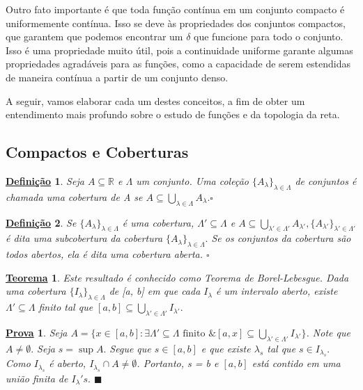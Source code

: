 \documentclass{article}
\newtheorem*{def*}{\underline{Defini\c c\~ao}}
\newtheorem*{theorem*}{\underline{Teorema}}
\newtheorem*{proof*}{\underline{Prova}}
\renewcommand\qedsymbol{$\blacksquare$}
\begin{document}
Outro fato importante é que toda função contínua em um conjunto compacto é uniformemente contínua. Isso se deve às propriedades
dos conjuntos compactos, que garantem que podemos encontrar um $\delta$ que funcione para todo o conjunto. Isso é uma
propriedade muito útil, pois a continuidade uniforme garante algumas propriedades agradáveis para as funções, como a
capacidade de serem estendidas de maneira contínua a partir de um conjunto denso.

A seguir, vamos elaborar cada um destes conceitos, a fim de obter um entendimento mais profundo sobre o estudo de funções e da 
topologia da reta.

\subsection{Compactos e Coberturas}
 \begin{def*}
   Seja $A\subseteq{\mathbb{R}}$ e $\Lambda $ um conjunto. Uma coleção $\{A_{\lambda }\}_{\lambda \in\Lambda }$ de conjuntos
   é chamada uma cobertura de A se $A\subseteq{\bigcup_{\lambda \in\Lambda }^{}{A_{\lambda }}}.\square$
 \end{def*}
\begin{def*}
  Se $\{A_{\lambda }\}_{\lambda \in\Lambda }$ é uma cobertura, $\Lambda '\subseteq{\Lambda }$ e $A\subseteq{\bigcup_{\lambda '\in\Lambda '}^{}{A_{\lambda '}}},
  \{A_{\lambda '}\}_{\lambda '\in\Lambda '}$ é dita uma subcobertura da cobertura $\{A_{\lambda }\}_{\lambda \in\Lambda }.$
  Se os conjuntos da cobertura são todos abertos, ela é dita uma cobertura aberta. $\square$
\end{def*}
\begin{theorem*}
  Este resultado é conhecido como Teorema de Borel-Lebesgue. Dada uma cobertura $\{I_{\lambda }\}_{\lambda \in\Lambda }$ de [a, b]
  em que cada $I_{\lambda }$ é um intervalo aberto, existe $\Lambda '\subseteq{\Lambda }$ finito tal que $[a, b]\subseteq{\bigcup_{\lambda '\in\Lambda '}^{}{I_{\lambda '}.}}$
\end{theorem*}
\begin{proof*}
  Seja $A=\{x\in[a,b]: \exists \Lambda'\subseteq{\Lambda }\text{ finito }\&[a,x]\subseteq{\bigcup_{\lambda '\in\Lambda '}^{}{I_{\lambda '}}}\}$.
  Note que $A \neq\emptyset.$ Seja $s=\sup{A}.$ Segue que $s\in[a, b]$ e que existe $\lambda _{s}$ tal que $s\in I_{\lambda _{s}}.$
  Como $I_{\lambda _{s}}$ é aberto, $I_{\lambda _{s}}\cap A \neq\emptyset$. Portanto, s = b e $[a, b]$ está contido em uma
  união finita de $I_{\lambda }'s.$ \qedsymbol
\end{proof*}
\end{document}
